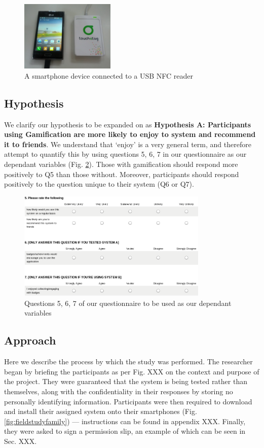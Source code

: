 \begin{figure}[H]
 \centering
  \includegraphics[width=0.4\textwidth]{img/nfcusb.jpg}
     \caption{A smartphone device connected to a USB NFC reader}
     \label{fig:usbnfc}
\end{figure}

\subsection{Hypothesis}
We clarify our hypothesis to be expanded on as \textbf{Hypothesis A: Participants using Gamification are more likely to enjoy to system and recommend it to friends}. We understand that `enjoy' is a very general term, and therefore attempt to quantify this by using questions 5, 6, 7 in our questionnaire as our dependant variables (Fig. \ref{fig:questionz}). Those with gamification should respond more positively to Q5 than those without. Moreover, participants should respond positively to the question unique to their system (Q6 or Q7).
\begin{figure}[H]
 \centering
  \includegraphics[width=0.81\textwidth]{img/questions.png}
     \caption{Questions 5, 6, 7 of our questionnaire to be used as our dependant variables}
     \label{fig:questionz}
\end{figure}
\newpage
\subsection{Approach}
Here we describe the process by which the study was performed. The researcher began by briefing the participants as per Fig. XXX on the context and purpose of the project. They were guaranteed that the system is being tested rather than themselves, along with the confidentiality in their responses by storing no personally identifying information. Participants were then required to download and install their assigned system onto their smartphones (Fig. \ref{fig:fieldstudyfamily}) --- instructions can be found in appendix XXX. Finally, they were asked to sign a permission slip, an example of which can be seen in Sec. XXX.

